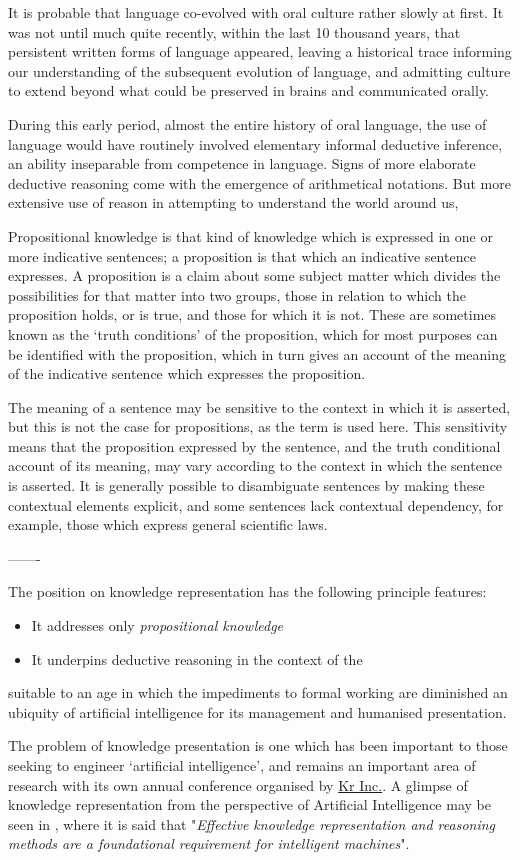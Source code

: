 It is probable that language co-evolved with oral culture rather slowly at first.
It was not until much quite recently, within the last 10 thousand years, that persistent written forms of language appeared, leaving a historical trace informing our understanding of the subsequent evolution of language, and admitting culture to extend beyond what could be preserved in brains and communicated orally.

During this early period, almost the entire history of oral language, the use of language would have routinely involved elementary informal deductive inference, an ability inseparable from competence in language.
Signs of more elaborate deductive reasoning come with the emergence of arithmetical notations.
But more extensive use of reason in attempting to understand the world around us,


Propositional knowledge is that kind of knowledge which is expressed in one or more indicative sentences; a proposition is that which an indicative sentence expresses.
A proposition is a claim about some subject matter which divides the possibilities for that matter into two groups, those in relation to which the proposition holds, or is true, and those for which it is not.
These are sometimes known as the `truth conditions' of the proposition, which for most purposes can be identified with the proposition, which in turn gives an account of the meaning of the indicative sentence which expresses the proposition.

The meaning of a sentence may be sensitive to the context in which it is asserted, but this is not the case for propositions, as the term is used here.
This sensitivity means that the proposition expressed by the sentence, and the truth conditional account of its meaning, may vary according to the context in which the sentence is asserted.
It is generally possible to disambiguate sentences by making these contextual elements explicit, and some sentences lack contextual dependency, for example, those which express general scientific laws.




-------

The position on knowledge representation has the following principle features:
\begin{itemize}
\item It addresses only \emph{propositional knowledge}

\item It underpins deductive reasoning in the context of the 

  
\end{itemize}
suitable to an age in which the impediments to formal working are diminished an ubiquity of artificial intelligence for its management and humanised presentation.

The problem of knowledge presentation is one which has been important to those seeking to engineer `artificial intelligence', and remains an important area of research with its own annual conference organised by \href{https://kr.org}{Kr Inc.}.
A glimpse of knowledge representation from the perspective of Artificial Intelligence may be seen in \emph{}\cite{fikes20}, where it is said that "\emph{Effective knowledge representation and reasoning methods are a foundational requirement for intelligent machines}".
